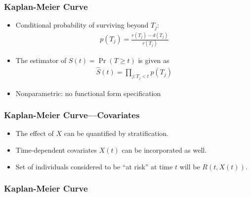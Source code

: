 \documentclass[aspectratio=169, 12pt]{beamer}
\begin{document}
	\begin{frame}
	\frametitle{Kaplan-Meier Curve}
	\begin{itemize}
	\item Conditional probability of surviving beyond $T_j$:
	\begin{eqnarray*}
	p(T_j) = \frac{r(T_j) - d(T_j)}{r(T_j)}
	\end{eqnarray*}
	\item The estimator of $S(t) = \Pr(T \geq t)$ is given as
	\begin{eqnarray*}
	\hat{S}(t) = \prod_{j: T_j < t} p(T_j)
	\end{eqnarray*}
	\item Nonparametric: no functional form specification

	\end{itemize}

	\end{frame}

	\begin{frame}
	\frametitle{Kaplan-Meier Curve---Covariates}
	\begin{itemize}
	\item The effect of $X$ can be quantified by stratification.
	\item Time-dependent covariates $X(t)$ can be incorporated as well.
	\item Set of individuals considered to be ``at risk'' at time $t$ will be $R(t, X(t))$.

	\end{itemize}

	\end{frame}

	\begin{frame}
	\frametitle{Kaplan-Meier Curve}
	\end{frame}
\end{document}
